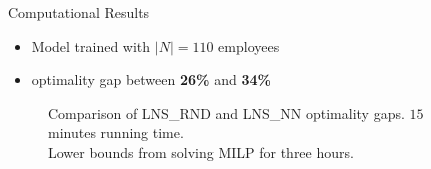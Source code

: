 \documentclass[aspectratio=1610]{beamer}
\begin{document}
\begin{frame}{Computational Results}
	\begin{itemize}
		\item Model trained with $|N| = 110$ employees
		\item {} optimality gap between \textbf{26\%} and \textbf{34\%}
	\end{itemize}
	\begin{figure}
		\caption{Comparison of LNS\_RND and LNS\_NN optimality gaps. $15$ minutes running time.\\ Lower bounds from solving MILP for three hours.}
	\end{figure}
\end{frame}
\end{document}
